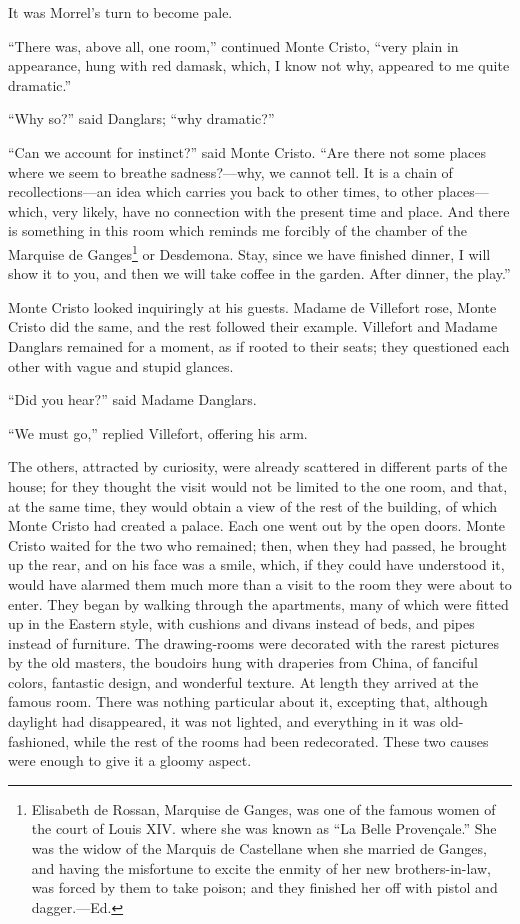 It was Morrel’s turn to become pale.

“There was, above all, one room,” continued Monte Cristo, “very plain
in appearance, hung with red damask, which, I know not why, appeared to
me quite dramatic.”

“Why so?” said Danglars; “why dramatic?”

“Can we account for instinct?” said Monte Cristo. “Are there not some
places where we seem to breathe sadness?—why, we cannot tell. It is a
chain of recollections—an idea which carries you back to other times,
to other places—which, very likely, have no connection with the present
time and place. And there is something in this room which reminds me
forcibly of the chamber of the Marquise de Ganges\footnote[10]{Elisabeth
de Rossan, Marquise de Ganges, was one of the famous women of the court
of Louis XIV. where she was known as “La Belle Provençale.” She was the
widow of the Marquis de Castellane when she married de Ganges, and having
the misfortune to excite the enmity of her new brothers-in-law, was
forced by them to take poison; and they finished her off with pistol
and dagger.—Ed.} or Desdemona. Stay, since we have finished dinner, I will
show it to you, and then we will take coffee in the garden. After dinner,
the play.”

Monte Cristo looked inquiringly at his guests. Madame de Villefort
rose, Monte Cristo did the same, and the rest followed their example.
Villefort and Madame Danglars remained for a moment, as if rooted to
their seats; they questioned each other with vague and stupid glances.

“Did you hear?” said Madame Danglars.

“We must go,” replied Villefort, offering his arm.

The others, attracted by curiosity, were already scattered in different
parts of the house; for they thought the visit would not be limited to
the one room, and that, at the same time, they would obtain a view of
the rest of the building, of which Monte Cristo had created a palace.
Each one went out by the open doors. Monte Cristo waited for the two
who remained; then, when they had passed, he brought up the rear, and
on his face was a smile, which, if they could have understood it, would
have alarmed them much more than a visit to the room they were about to
enter. They began by walking through the apartments, many of which were
fitted up in the Eastern style, with cushions and divans instead of
beds, and pipes instead of furniture. The drawing-rooms were decorated
with the rarest pictures by the old masters, the boudoirs hung with
draperies from China, of fanciful colors, fantastic design, and
wonderful texture. At length they arrived at the famous room. There was
nothing particular about it, excepting that, although daylight had
disappeared, it was not lighted, and everything in it was
old-fashioned, while the rest of the rooms had been redecorated. These
two causes were enough to give it a gloomy aspect.

